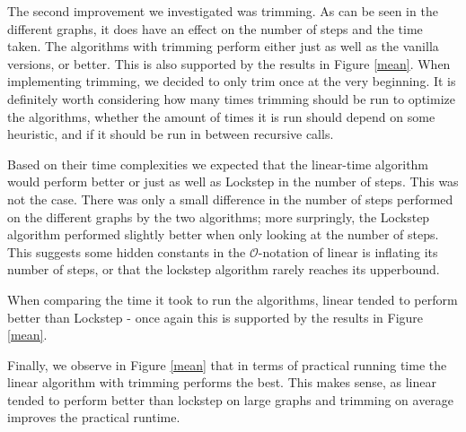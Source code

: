 \documentclass[../master/master.tex]{subfiles}
\begin{document}
The second improvement we investigated was trimming. As can be seen in the different graphs, it does have an effect on the number of steps and the time taken. The algorithms with trimming perform either just as well as the vanilla versions, or better. This is also supported by the results in Figure \ref{mean}. When implementing trimming, we decided to only trim once at the very beginning. It is definitely worth considering how many times trimming should be run to optimize the algorithms, whether the amount of times it is run should depend on some heuristic, and if it should be run in between recursive calls.

Based on their time complexities we expected that the linear-time algorithm would perform better or just as well as Lockstep in the number of steps. This was not the case. There was only a small difference in the number of steps performed on the different graphs by the two algorithms; more surpringly, the Lockstep algorithm performed slightly better when only looking at the number of steps. This suggests some hidden constants in the $\mathcal{O}$-notation of linear is inflating its number of steps, or that the lockstep algorithm rarely reaches its upperbound.

When comparing the time it took to run the algorithms, linear tended to perform better than Lockstep - once again this is supported by the results in Figure \ref{mean}.

Finally, we observe in Figure \ref{mean} that in terms of practical running time the linear algorithm with trimming performs the best. This makes sense, as linear tended to perform better than lockstep on large graphs and trimming on average improves the practical runtime.
\end{document}
